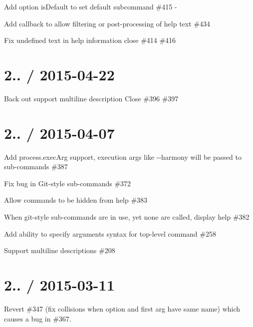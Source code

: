 
\begin{DoxyItemize}
\item Add option {\ttfamily is\+Default} to set default subcommand \#415 -\/
\item Add callback to allow filtering or post-\/processing of help text \#434 
\item Fix {\ttfamily undefined} text in help information close \#414 \#416 
\end{DoxyItemize}

\section*{2.. / 2015-\/04-\/22 }


\begin{DoxyItemize}
\item Back out {\ttfamily support multiline description} Close \#396 \#397
\end{DoxyItemize}

\section*{2.. / 2015-\/04-\/07 }


\begin{DoxyItemize}
\item Add {\ttfamily process.\+exec\+Arg} support, execution args like {\ttfamily -\/-\/harmony} will be passed to sub-\/commands \#387  
\item Fix bug in Git-\/style sub-\/commands \#372 
\item Allow commands to be hidden from help \#383 
\item When git-\/style sub-\/commands are in use, yet none are called, display help \#382 
\item Add ability to specify arguments syntax for top-\/level command \#258 
\item Support multiline descriptions \#208 
\end{DoxyItemize}

\section*{2.. / 2015-\/03-\/11 }


\begin{DoxyItemize}
\item Revert \#347 (fix collisions when option and first arg have same name) which causes a bug in \#367.
\end{DoxyItemize}

